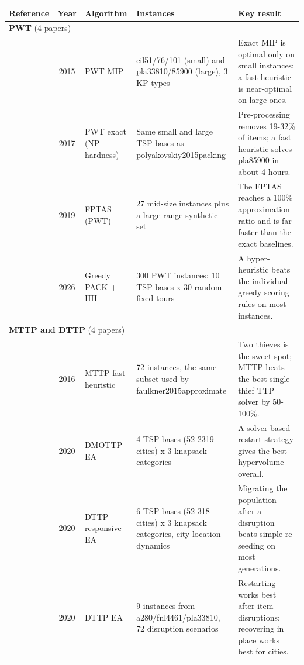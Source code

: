 \begin{center}
\footnotesize
{}
\label{tab:cat_small}
\begin{tabular}{@{}p{2.8cm}cp{3.0cm}p{4.9cm}p{7.9cm}@{}}
\toprule
\textbf{Reference} & \textbf{Year} & \textbf{Algorithm} & \textbf{Instances} & \textbf{Key result} \\
\midrule
\multicolumn{5}{l}{\textbf{PWT} (4 papers)} \\ \midrule
\citet{polyakovskiy2015packing} & 2015 & PWT MIP & eil51/76/101 (small) and pla33810/85900 (large), 3 KP types & Exact MIP is optimal only on small instances; a fast heuristic is near-optimal on large ones. \\
\citet{polyakovskiy2017packing} & 2017 & PWT exact (NP-hardness) & Same small and large TSP bases as polyakovskiy\allowbreak{}2015packing & Pre-processing removes 19-32\% of items; a fast heuristic solves pla85900 in about 4 hours. \\
\citet{neumann2019fully} & 2019 & FPTAS (PWT) & 27 mid-size instances plus a large-range synthetic set & The FPTAS reaches a 100\% approximation ratio and is far faster than the exact baselines. \\
\citet{don2026greedy} & 2026 & Greedy PACK + HH & 300 PWT instances: 10 TSP bases x 30 random fixed tours & A hyper-heuristic beats the individual greedy scoring rules on most instances. \\
\midrule
\multicolumn{5}{l}{\textbf{MTTP and DTTP} (4 papers)} \\ \midrule
\citet{chand2016fast} & 2016 & MTTP fast heuristic & 72 instances, the same subset used by faulkner2015\allowbreak{}approximate & Two thieves is the sweet spot; MTTP beats the best single-thief TTP solver by 50-100\%. \\
\citet{herring2020dynamic} & 2020 & DMOTTP EA & 4 TSP bases (52-2319 cities) x 3 knapsack categories & A solver-based restart strategy gives the best hypervolume overall. \\
\citet{herring2020responsive} & 2020 & DTTP responsive EA & 6 TSP bases (52-318 cities) x 3 knapsack categories, city-location dynamics & Migrating the population after a disruption beats simple re-seeding on most generations. \\
\citet{sachdeva2020dynamic} & 2020 & DTTP EA & 9 instances from a280/fnl4461/pla33810, 72 disruption scenarios & Restarting works best after item disruptions; recovering in place works best for cities. \\

\end{tabular}
\end{center}
